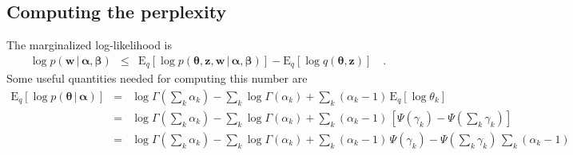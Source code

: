 \documentclass[11pt]{article}
\newcommand{\bvec}[1]{\ensuremath{\boldsymbol{#1}}}
\newcommand{\expect}[2]{\ensuremath{\mathrm{E}_{#1}\left [ {#2} \right ]}}
\begin{document}
\subsection{Computing the perplexity}

The marginalized log-likelihood is
\begin{eqnarray}
\log p (\bvec{w}\,|\,\bvec{\alpha},\bvec{\beta}) &\le&
    \expect{q}{\log p
        (\bvec{\theta},\bvec{z},\bvec{w}\,|\,\bvec{\alpha},\bvec{\beta})}
    - \expect{q}{\log q(\bvec{\theta},\bvec{z})} \quad.
\end{eqnarray}
Some useful quantities needed for computing this number are
\begin{eqnarray}
\expect{q}{\log p(\bvec{\theta}\,|\,\bvec{\alpha})} &=&
    \log \Gamma \left ( \sum_k \alpha_k \right )
    - \sum_k \log \Gamma \left ( \alpha_k \right )
    + \sum_k (\alpha_k - 1)\,\expect{q}{\log \theta_k} \\
&=& \log \Gamma \left ( \sum_k \alpha_k \right )
    - \sum_k \log \Gamma \left ( \alpha_k \right )
    + \sum_k (\alpha_k - 1)\,
    \left [ \Psi (\gamma_k) - \Psi \left(\sum_k \gamma_k\right) \right ]
    \nonumber \\
&=& \log \Gamma \left ( \sum_k \alpha_k \right )
    - \sum_k \log \Gamma \left ( \alpha_k \right )
    + \sum_k (\alpha_k - 1)\,\Psi (\gamma_k)
    - \Psi \left(\sum_k \gamma_k\right)\,\sum_k (\alpha_k - 1)
    \nonumber
\end{eqnarray}
\end{document}
